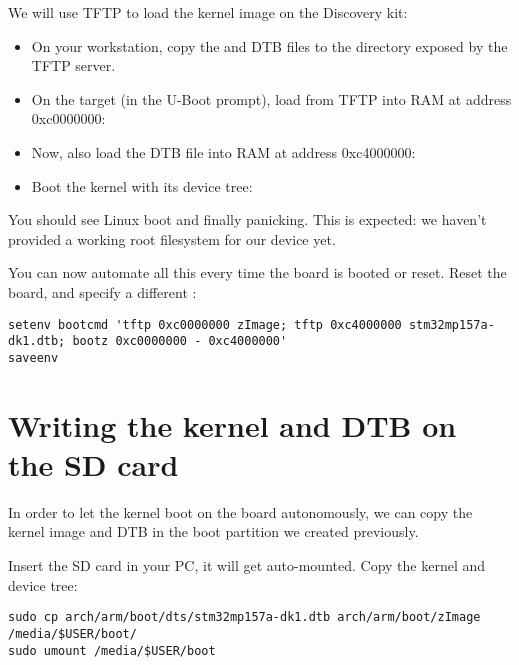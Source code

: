 We will use TFTP to load the kernel image on the Discovery kit:

\begin{itemize}

\item On your workstation, copy the  and DTB files to the
  directory exposed by the TFTP server.

\item On the target (in the U-Boot prompt), load  from
  TFTP into RAM at address 0xc0000000:\\

\item Now, also load the DTB file into RAM at address 0xc4000000:\\

\item Boot the kernel with its device tree:\\

\end{itemize}

You should see Linux boot and finally panicking. This is expected: we
haven't provided a working root filesystem for our device yet.

You can now automate all this every time the board is booted or
reset. Reset the board, and specify a different :

{\scriptsize
\begin{verbatim}
setenv bootcmd 'tftp 0xc0000000 zImage; tftp 0xc4000000 stm32mp157a-dk1.dtb; bootz 0xc0000000 - 0xc4000000'
saveenv
\end{verbatim}
}

\section{Writing the kernel and DTB on the SD card}

In order to let the kernel boot on the board autonomously, we can
copy the kernel image and DTB in the boot partition we created
previously.

Insert the SD card in your PC, it will get auto-mounted. Copy the
kernel and device tree:
\begin{verbatim}
sudo cp arch/arm/boot/dts/stm32mp157a-dk1.dtb arch/arm/boot/zImage /media/$USER/boot/
sudo umount /media/$USER/boot
\end{verbatim}

